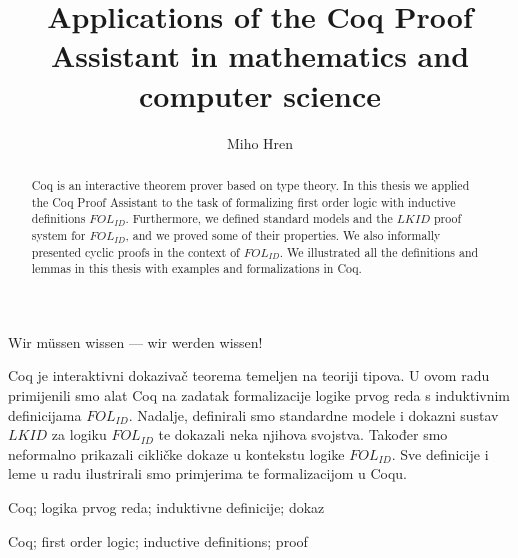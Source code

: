 \documentclass[diplomskirad, upload]{fer}
\title{Applications of the Coq Proof Assistant in mathematics and computer science}
\author{Miho Hren}
\theoremstyle{definition}
\theoremstyle{remark}
\begin{document}
\maketitle
{}

\begin{zahvale}
  \begin{huge}
    Wir m\"{u}ssen wissen --- wir werden wissen!
  \end{huge}
\end{zahvale}

\mainmatter{}

\tableofcontents











\begin{sazetak}
  Coq je interaktivni dokazivač teorema temeljen na teoriji tipova.
  U ovom radu primijenili smo alat Coq na zadatak formalizacije
  logike prvog reda s induktivnim definicijama \(\mathit{FOL}_{\mathit{ID}}\). Nadalje,
  definirali smo standardne modele i dokazni sustav \(\mathit{LKID}\) za logiku \(\mathit{FOL}_{\mathit{ID}}\) te
  dokazali neka njihova svojstva. Također smo neformalno prikazali cikličke dokaze
  u kontekstu logike \(\mathit{FOL}_{\mathit{ID}}\).
  Sve definicije i leme u radu ilustrirali smo primjerima te formalizacijom u Coqu.  
\end{sazetak}

\begin{kljucnerijeci}
  Coq; logika prvog reda; induktivne definicije; dokaz
\end{kljucnerijeci}

\begin{abstract}
  Coq is an interactive theorem prover based on type theory.
  In this thesis we applied the Coq Proof Assistant to the task of formalizing
  first order logic with inductive definitions \(\mathit{FOL}_{\mathit{ID}}\). Furthermore,
  we defined standard models and the \(\mathit{LKID}\) proof system for \(\mathit{FOL}_{\mathit{ID}}\),
  and we proved some of their properties. We also informally presented cyclic proofs in the context of \(\mathit{FOL}_{\mathit{ID}}\).
  We illustrated all the definitions and lemmas in this thesis with examples and formalizations in Coq.
\end{abstract}

\begin{keywords}
  Coq; first order logic; inductive definitions; proof
\end{keywords}


\backmatter{}
\end{document}
